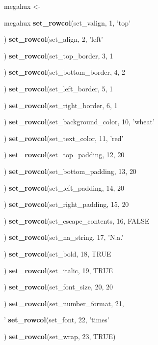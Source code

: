 \documentclass[]{article}
\newenvironment{Shaded}{\begin{snugshade}}{\end{snugshade}}
\newcommand{\KeywordTok}[1]{\textcolor[rgb]{0.13,0.29,0.53}{\textbf{{#1}}}}
\newcommand{\DecValTok}[1]{\textcolor[rgb]{0.00,0.00,0.81}{{#1}}}
\newcommand{\StringTok}[1]{\textcolor[rgb]{0.31,0.60,0.02}{{#1}}}
\newcommand{\OtherTok}[1]{\textcolor[rgb]{0.56,0.35,0.01}{{#1}}}
\newcommand{\NormalTok}[1]{{#1}}
\begin{document}
\begin{Shaded}
\begin{Highlighting}[]
\NormalTok{megahux <-}\StringTok{ }\NormalTok{megahux                                %>%}\StringTok{ }
\StringTok{      }\KeywordTok{set_rowcol}\NormalTok{(set_valign, }\DecValTok{1}\NormalTok{, }\StringTok{'top'}\NormalTok{)              %>%}\StringTok{ }
\StringTok{      }\KeywordTok{set_rowcol}\NormalTok{(set_align, }\DecValTok{2}\NormalTok{, }\StringTok{'left'}\NormalTok{)              %>%}\StringTok{ }
\StringTok{      }\KeywordTok{set_rowcol}\NormalTok{(set_top_border, }\DecValTok{3}\NormalTok{, }\DecValTok{1}\NormalTok{)              %>%}\StringTok{ }
\StringTok{      }\KeywordTok{set_rowcol}\NormalTok{(set_bottom_border, }\DecValTok{4}\NormalTok{, }\DecValTok{2}\NormalTok{)           %>%}\StringTok{ }
\StringTok{      }\KeywordTok{set_rowcol}\NormalTok{(set_left_border, }\DecValTok{5}\NormalTok{, }\DecValTok{1}\NormalTok{)             %>%}\StringTok{ }
\StringTok{      }\KeywordTok{set_rowcol}\NormalTok{(set_right_border, }\DecValTok{6}\NormalTok{, }\DecValTok{1}\NormalTok{)            %>%}\StringTok{ }
\StringTok{      }\KeywordTok{set_rowcol}\NormalTok{(set_background_color, }\DecValTok{10}\NormalTok{, }\StringTok{'wheat'}\NormalTok{)  %>%}\StringTok{ }
\StringTok{      }\KeywordTok{set_rowcol}\NormalTok{(set_text_color, }\DecValTok{11}\NormalTok{, }\StringTok{'red'}\NormalTok{)         %>%}\StringTok{ }
\StringTok{      }\KeywordTok{set_rowcol}\NormalTok{(set_top_padding, }\DecValTok{12}\NormalTok{, }\DecValTok{20}\NormalTok{)           %>%}\StringTok{ }
\StringTok{      }\KeywordTok{set_rowcol}\NormalTok{(set_bottom_padding, }\DecValTok{13}\NormalTok{, }\DecValTok{20}\NormalTok{)        %>%}\StringTok{ }
\StringTok{      }\KeywordTok{set_rowcol}\NormalTok{(set_left_padding, }\DecValTok{14}\NormalTok{, }\DecValTok{20}\NormalTok{)          %>%}\StringTok{ }
\StringTok{      }\KeywordTok{set_rowcol}\NormalTok{(set_right_padding, }\DecValTok{15}\NormalTok{, }\DecValTok{20}\NormalTok{)         %>%}\StringTok{ }
\StringTok{      }\KeywordTok{set_rowcol}\NormalTok{(set_escape_contents, }\DecValTok{16}\NormalTok{, }\OtherTok{FALSE}\NormalTok{)    %>%}
\StringTok{      }\KeywordTok{set_rowcol}\NormalTok{(set_na_string, }\DecValTok{17}\NormalTok{, }\StringTok{'N.a.'}\NormalTok{)         %>%}
\StringTok{      }\KeywordTok{set_rowcol}\NormalTok{(set_bold, }\DecValTok{18}\NormalTok{, }\OtherTok{TRUE}\NormalTok{)                %>%}
\StringTok{      }\KeywordTok{set_rowcol}\NormalTok{(set_italic, }\DecValTok{19}\NormalTok{, }\OtherTok{TRUE}\NormalTok{)              %>%}
\StringTok{      }\KeywordTok{set_rowcol}\NormalTok{(set_font_size, }\DecValTok{20}\NormalTok{, }\DecValTok{20}\NormalTok{)             %>%}
\StringTok{      }\KeywordTok{set_rowcol}\NormalTok{(set_number_format, }\DecValTok{21}\NormalTok{, }\StringTok{'%9.6f'}\NormalTok{)    %>%}
\StringTok{      }\KeywordTok{set_rowcol}\NormalTok{(set_font, }\DecValTok{22}\NormalTok{, }\StringTok{'times'}\NormalTok{)             %>%}\StringTok{ }
\StringTok{      }\KeywordTok{set_rowcol}\NormalTok{(set_wrap, }\DecValTok{23}\NormalTok{, }\OtherTok{TRUE}\NormalTok{)}

}}}}}}}}}}}}}}}}}}}}
\end{Highlighting}
\end{Shaded}
\end{document}

